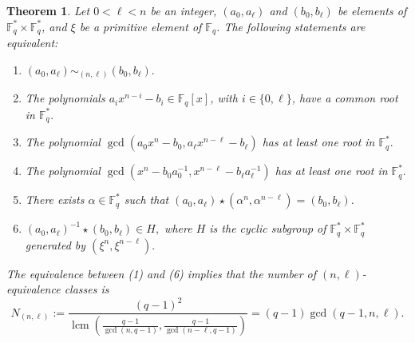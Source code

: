 \documentclass[10pt,a4paper]{amsart}
\newtheorem{theorem}{Theorem}
\newcommand{\Fq}{\mathbb{F}_{q}}
\DeclareMathOperator{\lcm}{lcm}
\begin{document}
\begin{theorem}\label{Th.1}
Let $0<\ell<n$ be an integer,  $(a_0, a_{\ell})$ and $(b_0, b_{\ell})$ be elements of $\mathbb{F}_q^{*} \times \mathbb{F}_q^{*}$,  and  $\xi$ be  a primitive element of $\Fq$. 
The following statements are equivalent:

\begin{enumerate}
    \item $(a_0, a_{\ell}) \sim_{(n,\ell)} (b_0, b_{\ell}).$

    \item The polynomials $ a_i x^{n-i } - b_i \in \mathbb{F}_q[x]$, with $i \in \{0, \ell\}$, have a common root in $\mathbb{F}_q^*.$

    \item The polynomial $\gcd(a_0 x^n - b_0, a_{\ell} x^{n - \ell} - b_{\ell})$ has at least one root in $\mathbb{F}_q^*.$
       \item The polynomial $\gcd(x^n - b_0 a_0^{-1}, x^{n - \ell} - b_{\ell} a_{\ell}^{-1})$ has at least one root in $\mathbb{F}_q^*.$
     \item  There exists $\alpha\in \Fq^*$ such that $ (a_0,a_{\ell})\star ( \alpha^n,   \alpha^{n-\ell})= (b_0,b_{\ell}) $.
     
      \item  $ (a_0, a_{\ell})^{-1} \star(b_0,b_{\ell})\in H,$ where   $H$ is the cyclic subgroup of $\Fq^*\times \Fq^*$ generated by $(\xi^n,\xi^{n-\ell}) .$
\end{enumerate}
The equivalence between (1) and (6) implies that the number of $(n,\ell)$-equivalence classes is $$N_{(n,\ell)}:= \dfrac{ (q-1)^2}{ \lcm(\frac{q-1}{ \gcd(n,q-1)}, \frac{q-1}{ \gcd(n-\ell,q-1)})} = (q-1) \gcd(q-1,n,\ell).
$$
\end{theorem}
\end{document}
